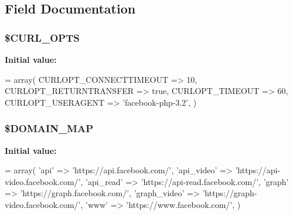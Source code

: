 \subsection{Field Documentation}
\hypertarget{class_base_facebook_af857bf8aaa1bbaf0798c8e44eeb05455}{
\subsubsection[{\$\-C\-U\-R\-L\-\_\-\-O\-P\-T\-S}]{\setlength{\rightskip}{0pt plus 5cm}\$C\-U\-R\-L\-\_\-\-O\-P\-T\-S\hspace{0.3cm}{\ttfamily [static]}}}\label{class_base_facebook_af857bf8aaa1bbaf0798c8e44eeb05455}
{\bfseries Initial value\-:}
\begin{DoxyCode}
= array(
    CURLOPT\_CONNECTTIMEOUT => 10,
    CURLOPT\_RETURNTRANSFER => \textcolor{keyword}{true},
    CURLOPT\_TIMEOUT        => 60,
    CURLOPT\_USERAGENT      => \textcolor{stringliteral}{'facebook-php-3.2'},
  )
\end{DoxyCode}
\hypertarget{class_base_facebook_a3d9af40cffd892f8e26b26464188297d}{
\subsubsection[{\$\-D\-O\-M\-A\-I\-N\-\_\-\-M\-A\-P}]{\setlength{\rightskip}{0pt plus 5cm}\$D\-O\-M\-A\-I\-N\-\_\-\-M\-A\-P\hspace{0.3cm}{\ttfamily [static]}}}\label{class_base_facebook_a3d9af40cffd892f8e26b26464188297d}
{\bfseries Initial value\-:}
\begin{DoxyCode}
= array(
    \textcolor{stringliteral}{'api'}         => \textcolor{stringliteral}{'https://api.facebook.com/'},
    \textcolor{stringliteral}{'api\_video'}   => \textcolor{stringliteral}{'https://api-video.facebook.com/'},
    \textcolor{stringliteral}{'api\_read'}    => \textcolor{stringliteral}{'https://api-read.facebook.com/'},
    \textcolor{stringliteral}{'graph'}       => \textcolor{stringliteral}{'https://graph.facebook.com/'},
    \textcolor{stringliteral}{'graph\_video'} => \textcolor{stringliteral}{'https://graph-video.facebook.com/'},
    \textcolor{stringliteral}{'www'}         => \textcolor{stringliteral}{'https://www.facebook.com/'},
  )
\end{DoxyCode}
